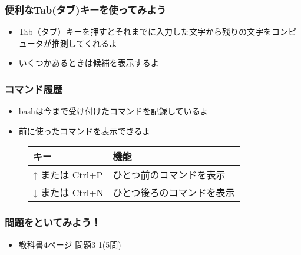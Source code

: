 \begin{frame}
    \frametitle{便利なTab(タブ)キーを使ってみよう}
    \begin{itemize}
        \item Tab（タブ）キーを押すとそれまでに入力した文字から残りの文字をコンピュータが推測してくれるよ
        \item いくつかあるときは候補を表示するよ
    \end{itemize}
    \begin{figure}[h]
        \centering
        
    \end{figure}
\end{frame}

\begin{frame}
    \frametitle{コマンド履歴}
    \begin{itemize}
        \item bashは今まで受け付けたコマンドを記録しているよ
        \item 前に使ったコマンドを表示できるよ
    \end{itemize}
    \begin{figure}[h]
        \center
        \begin{tabular}{ll}\hline
          キー & 機能 \\ \hline
          ↑ または Ctrl+P & ひとつ前のコマンドを表示\\
          ↓ または Ctrl+N & ひとつ後ろのコマンドを表示\\ \hline
        \end{tabular}
    \end{figure}
\end{frame}

\begin{frame}
    \frametitle{問題をといてみよう！}
    \begin{itemize}
        \item 教科書4ページ 問題3-1(5問)
    \end{itemize}
\end{frame}

